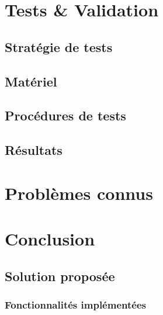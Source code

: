 \documentclass[11pt,a4paper,oldfontcommands]{memoir}
\begin{document}

\chapter{Tests \& Validation}

\section{Stratégie de tests}

\section{Matériel}

\section{Procédures de tests}

\section{Résultats}


\chapter{Problèmes connus}


\chapter{Conclusion}

\section{Solution proposée}

\subsection{Fonctionnalités implémentées}
\end{document}
